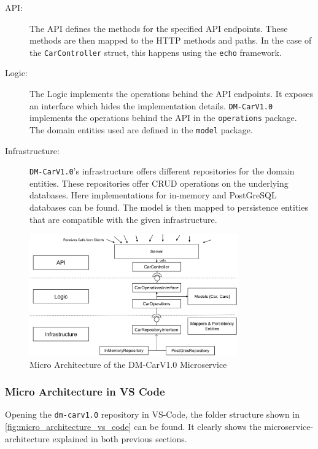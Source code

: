 \begin{description}
    \item[API:] The API defines the methods for the specified API endpoints. 
                These methods are then mapped to the HTTP methods and paths.
                In the case of the \texttt{CarController} struct, this happens using the \texttt{echo} framework.
    \item[Logic:] The Logic implements the operations behind the API endpoints.
                It exposes an interface which hides the implementation details.
                \texttt{DM-CarV1.0} implements the operations behind the API in the \texttt{operations} package.
                The domain entities used are defined in the \texttt{model} package.
    \item[Infrastructure:] \texttt{DM-CarV1.0}'s infrastructure offers different repositories for the domain entities.
                These repositories offer CRUD operations on the underlying databases.
                Here implementations for in-memory and PostGreSQL databases can be found.
                The model is then mapped to persistence entities that are compatible with the given infrastructure.
\end{description}

\begin{figure}
    \centering
    \includegraphics[width=0.8\textwidth]{figures/microservices/dmCar/ms_dmCar_microArchitecture.png}
    \caption{Micro Architecture of the DM-CarV1.0 Microservice}
    \label{fig:ms_dmCar_microArchitecture}
\end{figure}

\subsubsection*{Micro Architecture in VS Code}
Opening the \texttt{dm-carv1.0} repository in VS-Code, the folder structure shown in \autoref{fig:micro_architecture_vs_code} can be found. 
It clearly shows the microservice-architecture explained in both previous sections.

